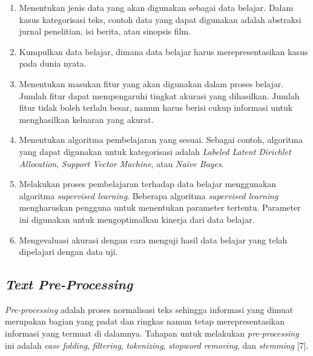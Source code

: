 \begin{enumerate}[nolistsep,leftmargin=0.5cm]
\item
Menentukan jenis data yang akan digunakan sebagai data belajar. Dalam kasus kategorisasi teks, contoh data yang dapat digunakan adalah abstraksi jurnal penelitian, isi berita, atau sinopsis film.
\item
Kumpulkan data belajar, dimana data belajar harus merepresentasikan kasus pada dunia nyata.
\item
Menentukan masukan fitur yang akan digunakan dalam proses belajar. Jumlah fitur dapat mempengaruhi tingkat akurasi yang dihasilkan. Jumlah fitur tidak boleh terlalu besar, namun harus berisi cukup informasi untuk menghasilkan keluaran yang akurat.
\item
Menentukan algoritma pembelajaran yang sesuai. Sebagai contoh, algoritma yang dapat digunakan untuk kategorisasi adalah {\itshape Labeled Latent Dirichlet Allocation}, {\itshape Support Vector Machine}, atau {\itshape Naïve Bayes}.
\item
Melakukan proses pembelajaran terhadap data belajar menggunakan algoritma {\itshape supervised learning}. Beberapa algoritma {\itshape supervised learning} mengharuskan pengguna untuk menentukan parameter tertentu. Parameter ini digunakan untuk mengoptimalkan kinerja dari data belajar.
\item
Mengevaluasi akurasi dengan cara menguji hasil data belajar yang telah dipelajari dengan data uji.
\end{enumerate}

\subsection{{\itshape Text Pre-Processing}}
\indent
{\itshape Pre-processing} adalah proses normalisasi teks sehingga informasi yang dimuat merupakan bagian yang padat dan ringkas namun tetap merepresentasikan informasi yang termuat di dalamnya. Tahapan untuk melakukan {\itshape pre-processing} ini adalah {\itshape case folding}, {\itshape filtering}, {\itshape tokenizing}, {\itshape stopword removing}, dan {\itshape stemming} [7].

